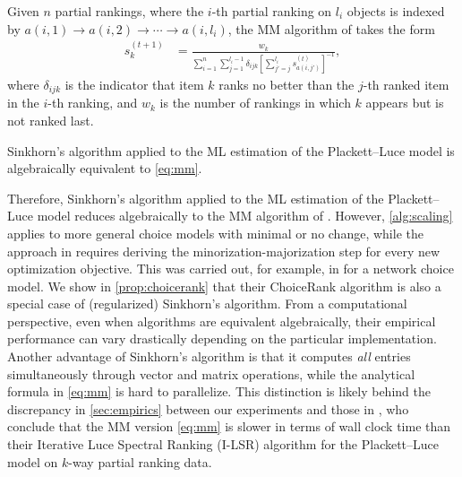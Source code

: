 Given $n$ partial rankings, where the $i$-th partial ranking on $l_{i}$ objects is indexed by $a(i,1)\rightarrow a(i,2)\rightarrow \cdots \rightarrow a(i,l_{i})$, the MM algorithm of \citet{hunter2004mm} takes the form 
\begin{align}
\label{eq:mm}
s_{k}^{(t+1)} & =\frac{w_{k}}{\sum_{i=1}^{n}\sum_{j=1}^{l_{i}-1}\delta_{ijk}[\sum_{j'=j}^{l_{i}}s_{a(i,j')}^{(t)}]^{-1}},
\end{align}
 where $\delta_{ijk}$ is the indicator that item $k$ ranks no better
than the $j$-th ranked item in the $i$-th ranking, and $w_{k}$ is the number of
rankings in which $k$ appears but is not ranked last. 
\begin{proposition}
\label{lem:mm}
Sinkhorn's algorithm applied to the ML estimation of the Plackett--Luce model is algebraically equivalent to \eqref{eq:mm}. 
\end{proposition}
Therefore, Sinkhorn's algorithm applied to the ML estimation of the Plackett--Luce model reduces algebraically to the MM algorithm of \citet{hunter2004mm}. However, \cref{alg:scaling} applies to more general choice models with minimal or no change, while the approach in \citet{hunter2004mm} requires deriving the minorization-majorization step for every new optimization objective. This was carried out, for example, in \citet{maystre2017choicerank} for a network choice model. We show in \cref{prop:choicerank} that their ChoiceRank algorithm is also a special case of (regularized) Sinkhorn's algorithm. From a computational perspective, even when algorithms are equivalent algebraically, their empirical performance can vary drastically depending
on the particular implementation. Another advantage of Sinkhorn's algorithm is that it computes \emph{all}
entries simultaneously through vector and matrix operations, while
the analytical formula in \eqref{eq:mm} is hard to parallelize. This distinction is likely behind
the discrepancy in \cref{sec:empirics} between our experiments and those in \citet{maystre2015fast},
who conclude that the MM version \eqref{eq:mm} is slower in terms of wall clock time than their Iterative Luce Spectral Ranking (I-LSR) algorithm for the Plackett--Luce model on $k$-way partial ranking data. 

